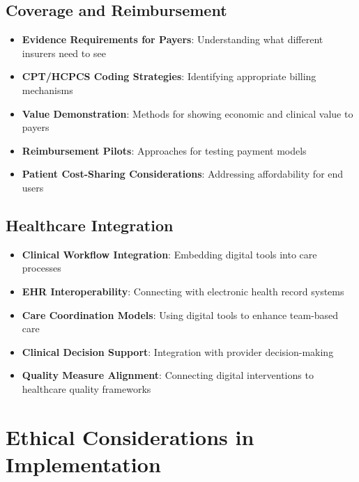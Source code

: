 \subsection{Coverage and Reimbursement}
\begin{itemize}
    \item \textbf{Evidence Requirements for Payers}: Understanding what different insurers need to see
    
    \item \textbf{CPT/HCPCS Coding Strategies}: Identifying appropriate billing mechanisms
    
    \item \textbf{Value Demonstration}: Methods for showing economic and clinical value to payers
    
    \item \textbf{Reimbursement Pilots}: Approaches for testing payment models
    
    \item \textbf{Patient Cost-Sharing Considerations}: Addressing affordability for end users
\end{itemize}

\subsection{Healthcare Integration}
\begin{itemize}
    \item \textbf{Clinical Workflow Integration}: Embedding digital tools into care processes
    
    \item \textbf{EHR Interoperability}: Connecting with electronic health record systems
    
    \item \textbf{Care Coordination Models}: Using digital tools to enhance team-based care
    
    \item \textbf{Clinical Decision Support}: Integration with provider decision-making
    
    \item \textbf{Quality Measure Alignment}: Connecting digital interventions to healthcare quality frameworks
\end{itemize}

\section{Ethical Considerations in Implementation}
